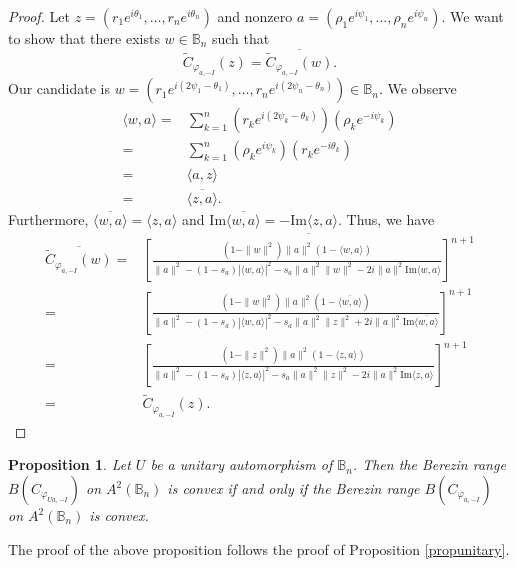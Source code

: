 \documentclass{amsart}
\newtheorem{proposition}{Proposition}
\theoremstyle{remark}
\newcommand{\B}{\mathbb{B}}
\begin{document}
\begin{proof}
Let $z=(r_1e^{i\theta_1},\dots,r_ne^{i\theta_n})$ and nonzero $a=(\rho_1e^{i\psi_1},\dots,\rho_ne^{i\psi_n})$. We want to show that there exists $w \in \B_n$ such that 
\[\widetilde{C}_{\varphi_{a,-I}}(z)= \overline{\widetilde{C}_{\varphi_{a,-I}}(w)}.\]
Our candidate is $w=(r_1e^{i(2\psi_1-\theta_1)},\dots,r_ne^{i(2\psi_n-\theta_n)}) \in \B_n$. We observe
\begin{align*}
\langle w,a \rangle =& \sum_{k=1}^n\left(r_ke^{i(2\psi_k-\theta_k)}\right)\left(\rho_ke^{-i\psi_k} \right) \\
=& \sum_{k=1}^n \left(\rho_ke^{i\psi_k} \right)\left(r_ke^{-i\theta_k} \right) \\
=& \langle a,z \rangle \\
=& \overline{\langle z,a \rangle}.
\end{align*}
Furthermore, $\overline{\langle w,a \rangle}=\langle z,a \rangle$ and $\mathrm{Im} \overline{\langle w,a \rangle}= -\mathrm{Im} \langle z,a \rangle $. Thus, we have
\begin{align*}
\overline{\widetilde{C}_{\varphi_{a,-I}}(w)} =& \overline{  \left[\frac{(1 - \|w\|^{2})\|a\|^{2}(1 - \langle w,a \rangle)}{\|a\|^{2} - (1-s_a)|\langle w,a \rangle|^2 - s_{a}\|a\|^2\|w\|^2-2i\|a\|^{2}\mathrm{Im}\langle w,a \rangle}\right]^{n+1}} \\
=&   \left[\frac{(1 - \|w\|^{2})\|a\|^{2}(1 - \overline{\langle w,a \rangle})}{\|a\|^{2} - (1-s_a)|\langle w,a \rangle|^2 - s_{a}\|a\|^2\|z\|^2+2i\|a\|^{2}\mathrm{Im}\overline{\langle w,a \rangle}}\right]^{n+1} \\
=&   \left[\frac{(1 - \|z\|^{2})\|a\|^{2}(1 - \langle z,a \rangle)}{\|a\|^{2} - (1-s_a)|\langle z,a \rangle|^2 - s_{a}\|a\|^2\|z\|^2 - 2i\|a\|^{2}\mathrm{Im}\langle z,a \rangle}\right]^{n+1} \\
=& \widetilde{C}_{\varphi_{a,-I}}(z).
\end{align*}
\end{proof}
\begin{proposition}\label{propunitary2}
    Let $U$ be a unitary automorphism of $\mathbb{B}_n$.  Then the Berezin range
    $B(C_{\varphi_{Ua,-I}})$ on $A^2(\mathbb{B}_n)$ is convex if and only if the Berezin range $B(C_{\varphi_{a,-I}})$ on $A^2(\mathbb{B}_n)$ is convex.
\end{proposition} \noindent
The proof of the above proposition follows the proof of Proposition \ref{propunitary}.
\end{document}
